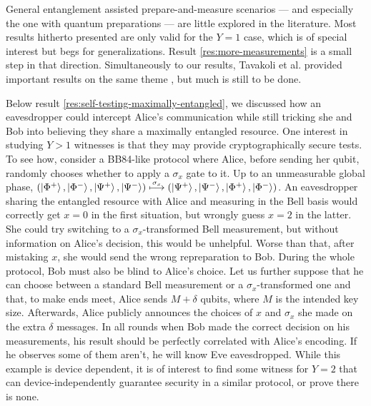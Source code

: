     General entanglement assisted prepare-and-measure scenarios --- and especially the one with quantum preparations --- are little explored in the literature. Most results hitherto presented are only valid for the $Y=1$ case, which is of special interest but begs for generalizations. Result \ref{res:more-measurements} is a small step in that direction. Simultaneously to our results, Tavakoli et al. provided important results on the same theme \cite{tavakoli_eapam_2021}, but much is still to be done.

    Below result \ref{res:self-testing-maximally-entangled}, we discussed how an eavesdropper could intercept Alice's communication while still tricking she and Bob into believing they share a maximally entangled resource. One interest in studying $Y > 1$ witnesses is that they may provide cryptographically secure tests. To see how, consider a BB84-like protocol \cite{bb84} where Alice, before sending her qubit, randomly chooses whether to apply a $\sigma_x$ gate to it. Up to an unmeasurable global phase, $\left( \ket{\Phi^+}, \ket{\Phi^-}, \ket{\Psi^+}, \ket{\Psi^-} \right) \overset{\sigma_x}{\longmapsto} ( \ket{\Psi^+}, \ket{\Psi^-}, \ket{\Phi^+}, \ket{\Phi^-})$. An eavesdropper sharing the entangled resource with Alice and measuring in the Bell basis would correctly get $x=0$ in the first situation, but wrongly guess $x=2$ in the latter. She could try switching to a $\sigma_x$-transformed Bell measurement, but without information on Alice's decision, this would be unhelpful. Worse than that, after mistaking $x$, she would send the wrong repreparation to Bob. During the whole protocol, Bob must also be blind to Alice's choice. Let us further suppose that he can choose between a standard Bell measurement or a $\sigma_x$-transformed one and that, to make ends meet, Alice sends $M + \delta$ qubits, where $M$ is the intended key size. Afterwards, Alice publicly announces the choices of $x$ and $\sigma_x$ she made on the extra $\delta$ messages. In all rounds when Bob made the correct decision on his measurements, his result should be perfectly correlated with Alice's encoding. If he observes some of them aren't, he will know Eve eavesdropped. While this example is device dependent, it is of interest to find some witness for $Y=2$ that can device-independently guarantee security in a similar protocol, or prove there is none.

